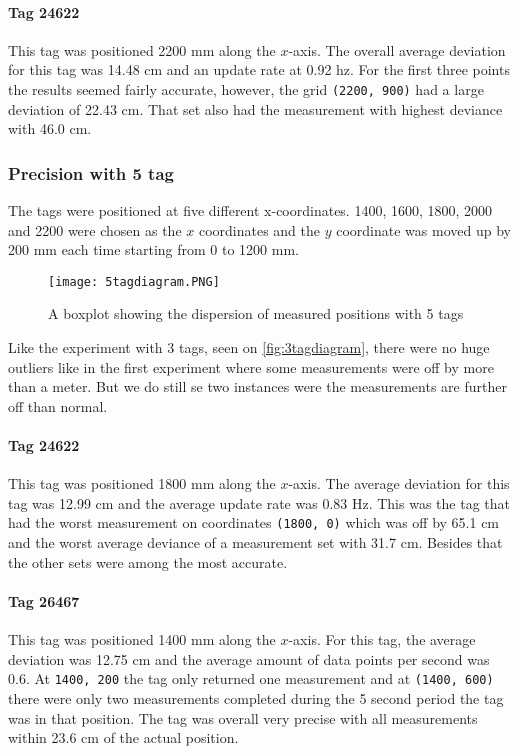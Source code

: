 \paragraph{Tag 24622}
This tag was positioned 2200 mm along the $x$-axis.
The overall average deviation for this tag was 14.48 cm and an update rate at 0.92 hz.
For the first three points the results seemed fairly accurate, however, the grid \texttt{(2200, 900)} had a large deviation of 22.43 cm.
That set also had the measurement with highest deviance with 46.0 cm.

\subsubsection{Precision with 5 tag}
The tags were positioned at five different x-coordinates. 
1400, 1600, 1800, 2000 and 2200 were chosen as the $x$ coordinates and the $y$ coordinate was moved up by 200 mm each time starting from 0 to 1200 mm.
\begin{figure}[H]
    \centering
    \texttt{[image: 5tagdiagram.PNG]}
    \caption{A boxplot showing the dispersion of measured positions with 5 tags}
    \label{fig:5tagdiagram}
\end{figure}
\noindent
Like the experiment with 3 tags, seen on \autoref{fig:3tagdiagram}, there were no huge outliers like in the first experiment where some measurements were off by more than a meter.
But we do still se two instances were the measurements are further off than normal.


\paragraph{Tag 24622}
This tag was positioned 1800 mm along the $x$-axis.
The average deviation for this tag was 12.99 cm and the average update rate was 0.83 Hz.
This was the tag that had the worst measurement on coordinates \texttt{(1800, 0)} which was off by 65.1 cm and the worst average deviance of a measurement set with 31.7 cm.
Besides that the other sets were among the most accurate.

\paragraph{Tag 26467}
This tag was positioned 1400 mm along the $x$-axis.
For this tag, the average deviation was 12.75 cm and the average amount of data points per second was 0.6.
At \texttt{1400, 200} the tag only returned one measurement and at \texttt{(1400, 600)} there were only two measurements completed during the 5 second period the tag was in that position.
The tag was overall very precise with all measurements within 23.6 cm of the actual position.

